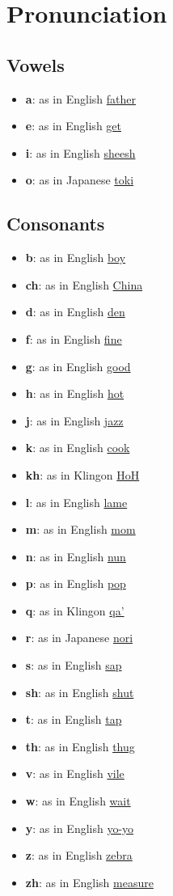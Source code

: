 \chapter*{Pronunciation}
\section*{Vowels}
\begin{itemize}
	\item \textbf{a}: as in English \underline{father}
	\item \textbf{e}: as in English \underline{get}
	\item \textbf{i}: as in English \underline{sheesh}
	\item \textbf{o}: as in Japanese \underline{toki}
\end{itemize}
\section*{Consonants}
\begin{itemize}
	\item \textbf{b}: as in English \underline{boy}
	\item \textbf{ch}: as in English \underline{China}
	\item \textbf{d}: as in English \underline{den}
	\item \textbf{f}: as in English \underline{fine}
	\item \textbf{g}: as in English \underline{good}
	\item \textbf{h}: as in English \underline{hot}
	\item \textbf{j}: as in English \underline{jazz}
	\item \textbf{k}: as in English \underline{cook}
	\item \textbf{kh}: as in Klingon \underline{HoH}
	\item \textbf{l}: as in English \underline{lame}
	\item \textbf{m}: as in English \underline{mom}
	\item \textbf{n}: as in English \underline{nun}
	\item \textbf{p}: as in English \underline{pop}
	\item \textbf{q}: as in Klingon \underline{qa'}
	\item \textbf{r}: as in Japanese \underline{nori}
	\item \textbf{s}: as in English \underline{sap}
	\item \textbf{sh}: as in English \underline{shut}
	\item \textbf{t}: as in English \underline{tap}
	\item \textbf{th}: as in English \underline{thug}
	\item \textbf{v}: as in English \underline{vile}
	\item \textbf{w}: as in English \underline{wait}
	\item \textbf{y}: as in English \underline{yo-yo}
	\item \textbf{z}: as in English \underline{zebra}
	\item \textbf{zh}: as in English \underline{measure}
\end{itemize}
